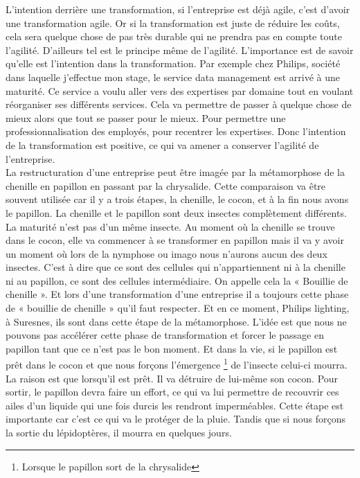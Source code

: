 \documentclass[12pt,a4paper]{article}
\begin{document}
L'intention derrière une transformation, si l'entreprise est déjà agile, c'est d'avoir une transformation agile. Or si la transformation est juste de réduire les coûts, cela sera quelque chose de pas très durable qui ne prendra pas en compte toute l'agilité. D'ailleurs tel est le principe même de l'agilité. L'importance est de savoir qu'elle est l'intention dans la transformation.
Par exemple chez Philips, société dans laquelle j'effectue mon stage, le service data management est arrivé à une maturité. Ce service a voulu aller vers des expertises par domaine tout en voulant réorganiser ses différents services. Cela va permettre de passer à quelque chose de mieux alors que tout se passer pour le mieux. Pour permettre une professionnalisation des employés, pour recentrer les expertises. Donc l'intention de la transformation est positive, ce qui va amener a conserver l'agilité de l'entreprise.\\

La restructuration d'une entreprise peut être imagée par la métamorphose de la chenille en papillon en passant par la chrysalide. Cette comparaison va être souvent utilisée car il y a trois étapes, la chenille, le cocon, et à la fin nous avons le papillon. La chenille et le papillon sont deux insectes complètement différents. La maturité n'est pas d'un même insecte. Au moment où la chenille se trouve dans le cocon, elle va commencer à se transformer en papillon mais il va y avoir un moment où lors de la nymphose ou imago nous n'aurons aucun des deux insectes. C'est à dire que ce sont des cellules qui n'appartiennent ni à la chenille ni au papillon, ce sont des cellules intermédiaire. On appelle cela la « Bouillie de chenille ». Et lors d'une transformation d'une entreprise il a toujours cette  phase de « bouillie de chenille » qu'il faut respecter. Et en ce moment, Philips lighting, à Suresnes, ils sont dans cette étape de la métamorphose. L'idée est que nous ne pouvons pas accélérer cette phase de transformation et forcer le passage en papillon tant que ce n'est pas le bon moment. Et dans la vie, si le papillon est prêt dans le cocon et que nous forçons l'émergence \footnote{Lorsque le papillon sort de la chrysalide} de l'insecte celui-ci mourra. La raison est que lorsqu'il est prêt. Il va détruire de lui-même son cocon. Pour sortir, le papillon devra faire un effort, ce qui va lui permettre de recouvrir ces ailes d'un liquide qui une fois durcis les rendront imperméables. Cette étape est importante car c'est ce qui va le protéger de la pluie. Tandis que si nous forçons la sortie du lépidoptères, il mourra en quelques jours. \\
\end{document}
